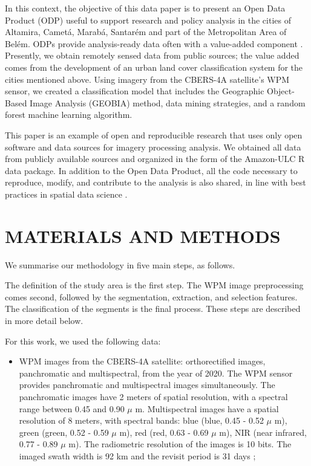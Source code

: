 \documentclass[preprint, 3p,
authoryear]{elsarticle} %
\providecommand{\tightlist}{%
  \setlength{\itemsep}{0pt}\setlength{\parskip}{0pt}}
\begin{document}
In this context, the objective of this data paper is to present an Open
Data Product (ODP) useful to support research and policy analysis in the
cities of Altamira, Cametá, Marabá, Santarém and part of the
Metropolitan Area of Belém. ODPs provide analysis-ready data often with
a value-added component \citep[see][]{arribas2021open}. Presently, we
obtain remotely sensed data from public sources; the value added comes
from the development of an urban land cover classification system for
the cities mentioned above. Using imagery from the CBERS-4A satellite's
WPM sensor, we created a classification model that includes the
Geographic Object-Based Image Analysis (GEOBIA) method, data mining
strategies, and a random forest machine learning algorithm.

This paper is an example of open and reproducible research that uses
only open software and data sources for imagery processing analysis. We
obtained all data from publicly available sources and organized in the
form of the Amazon-ULC R data package. In addition to the Open Data
Product, all the code necessary to reproduce, modify, and contribute to
the analysis is also shared, in line with best practices in spatial data
science \citep{brunsdon2021opening, DESJARDINS2022103091}.

\hypertarget{materials-and-methods}{%
\section{MATERIALS AND METHODS}\label{materials-and-methods}}

We summarise our methodology in five main steps, as follows.

The definition of the study area is the first step. The WPM image
preprocessing comes second, followed by the segmentation, extraction,
and selection features. The classification of the segments is the final
process. These steps are described in more detail below.

For this work, we used the following data:

\begin{itemize}
\tightlist
\item
  WPM images from the CBERS-4A satellite: orthorectified images,
  panchromatic and multispectral, from the year of 2020. The WPM sensor
  provides panchromatic and multispectral images simultaneously. The
  panchromatic images have 2 meters of spatial resolution, with a
  spectral range between 0.45 and 0.90 \(\mu\) m. Multispectral images
  have a spatial resolution of 8 meters, with spectral bands: blue
  (blue, 0.45 - 0.52 \(\mu\) m), green (green, 0.52 - 0.59 \(\mu\) m),
  red (red, 0.63 - 0.69 \(\mu\) m), NIR (near infrared, 0.77 - 0.89
  \(\mu\) m). The radiometric resolution of the images is 10 bits. The
  imaged swath width is 92 km and the revisit period is 31 days
  \citep{INPE2019};
\end{itemize}
\end{document}
